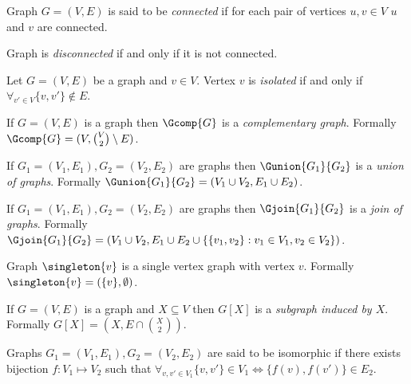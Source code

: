 \begin{defi}
    Graph $G = (V,E)$ is said to be \emph{connected} if for each pair of vertices $u,v \in V$ $u$ and $v$ are connected.

    Graph is \emph{disconnected} if and only if it is not connected.
\end{defi}

\begin{defi}
    Let $G = (V,E)$ be a graph and $v \in V$. Vertex $v$ is \emph{isolated} if and only if $\forall_{v' \in V} \{v,v'\} \not\in E$.
\end{defi}

\begin{defi}
    If $G = (V, E)$ is a graph then $\Gcomp{G}$ is a \emph{complementary graph}. Formally $\Gcomp{G} = (V, \binom{V}{2} \setminus E)$.
\end{defi}
\begin{defi}
    If $G_1 = (V_1, E_1), G_2 = (V_2, E_2)$ are graphs then $\Gunion{G_1}{G_2}$ is a \emph{union of graphs}. Formally $\Gunion{G_1}{G_2} = (V_1 \cup V_2, E_1 \cup E_2)$.
\end{defi}
\begin{defi}
    If $G_1 = (V_1, E_1), G_2 = (V_2, E_2)$ are graphs then $\Gjoin{G_1}{G_2}$ is a \emph{join of graphs}. Formally $\Gjoin{G_1}{G_2} = (V_1 \cup V_2, E_1 \cup E_2 \cup \{\{v_1,v_2\} : v_1 \in V_1, v_2 \in V_2\})$.
\end{defi}

\begin{defi}
    Graph $\singleton{v}$ is a single vertex graph with vertex $v$. Formally $\singleton{v} = (\{v\}, \emptyset)$.
\end{defi}

\begin{defi}
    If $G = (V,E)$ is a graph and $X \subseteq V$ then $G[X]$ is a \emph{subgraph induced by $X$}. Formally $G[X] = (X, E \cap \binom{X}{2})$.
\end{defi}

\begin{defi}
    Graphs $G_1 = (V_1, E_1), G_2 = (V_2, E_2)$ are said to be isomorphic if there exists bijection $f\colon V_1 \mapsto V_2$ such that $\forall_{v, v' \in V_1} \{v,v'\} \in V_1 \iff \{f(v), f(v')\} \in E_2$.
\end{defi}

